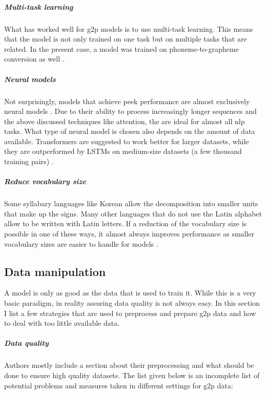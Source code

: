 \subparagraph{Multi-task learning}
What has worked well for \ac{g2p} models is to use multi-task learning. This means that the model is not only trained on one task but on multiple tasks that are related. In the present case, a model was trained on phoneme-to-grapheme conversion as well \citep{gorman-etal-2020-sigmorphon}.

\subparagraph{Neural models}
Not surprisingly, models that achieve peek performance are almost exclusively neural models \citep{gorman-etal-2020-sigmorphon}. Due to their ability to process increasingly longer sequences and the above discussed techniques like attention, the are ideal for almost all \ac{nlp} tasks. What type of neural model is chosen also depends on the amount of data available. Transformers are suggested to work better for larger datasets, while they are outperformed by LSTMs on medium-size datasets (a few thousand training pairs) \citep{gorman-etal-2020-sigmorphon}.

\subparagraph{Reduce vocabulary size}
Some syllabary languages like Korean allow the decomposition into smaller units that make up the signs. Many other languages that do not use the Latin alphabet allow to be written with Latin letters. If a reduction of the vocabulary size is possible in one of these ways, it almost always improves performance as smaller vocabulary sizes are easier to handle for models \citep{gorman-etal-2020-sigmorphon}. 

\subsection{Data manipulation}
A model is only as good as the data that is used to train it. While this is a very basic paradigm, in reality assuring data quality is not always easy. In this section I list a few strategies that are used to preprocess and prepare \ac{g2p} data and how to deal with too little available data. 

\subparagraph{Data quality}
\label{data_qual}
Authors mostly include a section about their preprocessing and what should be done to ensure high quality datasets. The list given below is an incomplete list of potential problems and measures taken in different settings for \ac{g2p} data:

